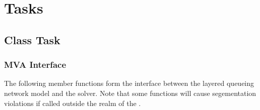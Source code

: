 % 
\section{Tasks}
\label{sec:task}

\subsection{Class Task}

\label{sec:task-mva}
\subsubsection{MVA Interface}

The following member functions form the interface between the layered
queueing network model and the  solver.  Note that
some functions will cause segementation violations if called outside
the realm of the .

\label{sec:task-makeClient}
\label{sec:task-saveClientResults}

